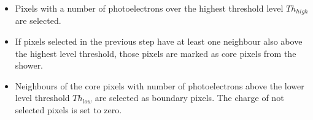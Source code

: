 \documentclass[main.tex]{subfiles}
\begin{document}
\begin{itemize}

\item Pixels with a number of photoelectrons over the highest threshold level $Th_{high}$ are selected.
\item If pixels selected in the previous step have at least one neighbour also above the highest level threshold, those pixels are marked as core pixels from the shower.

 \item Neighbours of the core pixels with number of photoelectrons above the lower level threshold $Th_{low}$ are selected as boundary pixels. The charge of not selected pixels is set to zero. \\
\end{itemize}
   
\end{document}
